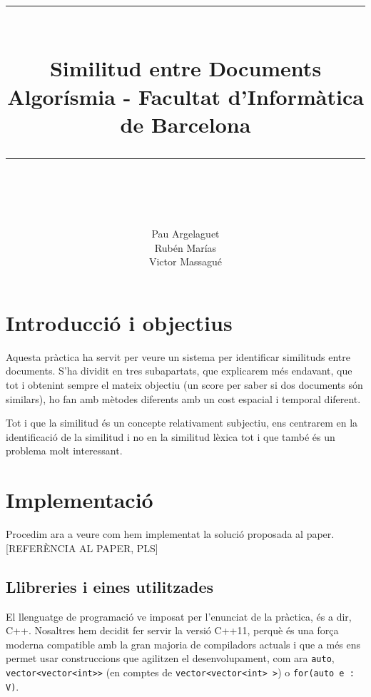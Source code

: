 \documentclass[catalan, 12pt]{report}
\newcommand{\HRule}[1]{\rule{\linewidth}{#1}}
\begin{document}
\date{}
\title{
		\HRule{2pt} \\ [0.5cm]
		\textbf{Similitud entre Documents \\ }
        {Algorísmia - Facultat d'Informàtica de Barcelona}
		\HRule{2pt} \\ [0.5cm]
        \vspace{100px}
		}
\date{}
\author{
		Pau Argelaguet \\ Rubén Marías \\ Victor Massagué  \\
	    }
\date{}
\maketitle
\tableofcontents
\thispagestyle{empty}

\chapter{Introducció  i objectius}

Aquesta pràctica ha servit per veure un sistema per identificar similituds entre documents. S'ha dividit en tres subapartats, que explicarem més endavant, que tot i obtenint sempre el mateix objectiu (un score per saber si dos documents són similars), ho fan amb mètodes diferents amb un cost espacial i temporal diferent.

Tot i que la similitud és un concepte relativament subjectiu, ens centrarem en la identificació de la similitud i no en la similitud lèxica tot i que també és un problema molt interessant.

\chapter{Implementació}

Procedim ara a veure com hem implementat la solució proposada al paper. [REFERÈNCIA AL PAPER, PLS]

\section{Llibreries i eines utilitzades}

El llenguatge de programació ve imposat per l'enunciat de la pràctica, és a dir, C++. Nosaltres hem decidit fer servir la versió C++11, perquè és una força moderna compatible amb la gran majoria de compiladors actuals i que a més ens permet usar construccions que agilitzen el desenvolupament, com ara \verb|auto|, \verb|vector<vector<int>>| (en comptes de \verb|vector<vector<int> >|) o \verb|for(auto e : V)|.
\end{document}
